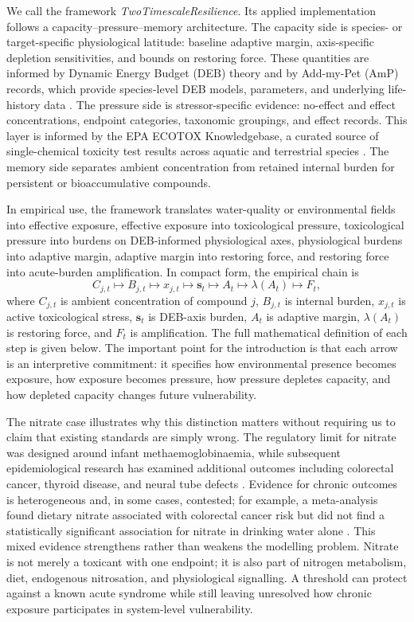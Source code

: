We call the framework \emph{TwoTimescaleResilience}. Its applied implementation follows a capacity--pressure--memory architecture. The capacity side is species- or target-specific physiological latitude: baseline adaptive margin, axis-specific depletion sensitivities, and bounds on restoring force. These quantities are informed by Dynamic Energy Budget (DEB) theory and by Add-my-Pet (AmP) records, which provide species-level DEB models, parameters, and underlying life-history data \citep{kooijman2010deb,marques2018amp}. The pressure side is stressor-specific evidence: no-effect and effect concentrations, endpoint categories, taxonomic groupings, and effect records. This layer is informed by the EPA ECOTOX Knowledgebase, a curated source of single-chemical toxicity test results across aquatic and terrestrial species \citep{olker2022ecotox}. The memory side separates ambient concentration from retained internal burden for persistent or bioaccumulative compounds.

In empirical use, the framework translates water-quality or environmental fields into effective exposure, effective exposure into toxicological pressure, toxicological pressure into burdens on DEB-informed physiological axes, physiological burdens into adaptive margin, adaptive margin into restoring force, and restoring force into acute-burden amplification. In compact form, the empirical chain is
\begin{equation}
  C_{j,t}\mapsto B_{j,t}\mapsto x_{j,t}\mapsto \mathbf{s}_{t}
  \mapsto A_t\mapsto\lambda(A_t)\mapsto F_t,
  \label{eq:intro_empirical_chain}
\end{equation}
where $C_{j,t}$ is ambient concentration of compound $j$, $B_{j,t}$ is internal burden, $x_{j,t}$ is active toxicological stress, $\mathbf{s}_t$ is DEB-axis burden, $A_t$ is adaptive margin, $\lambda(A_t)$ is restoring force, and $F_t$ is amplification. The full mathematical definition of each step is given below. The important point for the introduction is that each arrow is an interpretive commitment: it specifies how environmental presence becomes exposure, how exposure becomes pressure, how pressure depletes capacity, and how depleted capacity changes future vulnerability.

The nitrate case illustrates why this distinction matters without requiring us to claim that existing standards are simply wrong. The regulatory limit for nitrate was designed around infant methaemoglobinaemia, while subsequent epidemiological research has examined additional outcomes including colorectal cancer, thyroid disease, and neural tube defects \citep{ward2018nitrate}. Evidence for chronic outcomes is heterogeneous and, in some cases, contested; for example, a meta-analysis found dietary nitrate associated with colorectal cancer risk but did not find a statistically significant association for nitrate in drinking water alone \citep{hosseini2021nitrate}. This mixed evidence strengthens rather than weakens the modelling problem. Nitrate is not merely a toxicant with one endpoint; it is also part of nitrogen metabolism, diet, endogenous nitrosation, and physiological signalling. A threshold can protect against a known acute syndrome while still leaving unresolved how chronic exposure participates in system-level vulnerability.

